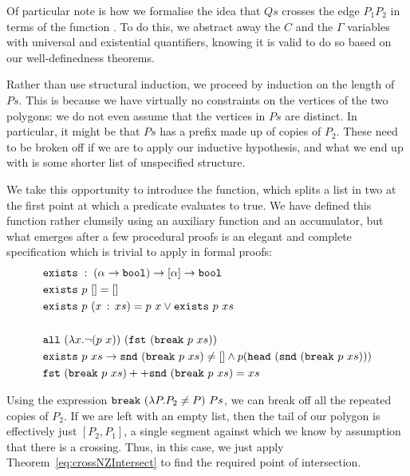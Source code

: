 Of particular note is how we formalise the idea that $Qs$ crosses the edge $P_1P_2$ in terms of the function . To do this, we abstract away the $C$ and the $\Gamma$ variables with universal and existential quantifiers, knowing it is valid to do so based on our well-definedness theorems.

Rather than use structural induction, we proceed by induction on the length of $Ps$. This is because we have virtually no constraints on the vertices of the two polygons: we do not even assume that the vertices in $Ps$ are distinct. In particular, it might be that $Ps$ has a prefix made up of copies of $P_2$. These need to be broken off if we are to apply our inductive hypothesis, and what we end up with is some shorter list of unspecified structure.

We take this opportunity to introduce the  function, which splits a list in two at the first point at which a predicate evaluates to true. We have defined this function rather clumsily using an auxiliary function and an accumulator, but what emerges after a few procedural proofs is an elegant and complete specification which is trivial to apply in formal proofs:
\begin{align*}
&\code{exists}\;:\;(\alpha\rightarrow\code{bool})\rightarrow [\alpha] \rightarrow \code{bool}\\
&\code{exists}\ p\ [] = []\\
&\code{exists}\ p\ (\cons{x}{xs}) = p\ x \vee \code{exists}\ p\ xs\\
\\
&\code{all}\ (\lambda x. \neg(p\ x))\ (\code{fst}\ (\code{break}\ p\ xs))\\
&\code{exists}\ p\ xs \rightarrow \code{snd}\ (\code{break}\ p\ xs) \neq [] \wedge p (\code{head}\ (\code{snd}\ (\code{break}\ p\ xs)))\\
&\append{\code{fst}\ (\code{break}\ p\ xs)}{\code{snd}\ (\code{break}\ p\ xs)} = xs
\end{align*}

Using the expression $\code{break}\ (\lambda P. P_2 \neq P)\ Ps$, we can break off all the repeated copies of $P_2$. If we are left with an empty list, then the tail of our polygon is effectively just $[P_2,P_1]$, a single segment against which we know by assumption that there is a crossing. Thus, in this case, we just apply Theorem~\ref{eq:crossNZIntersect} to find the required point of intersection. 


